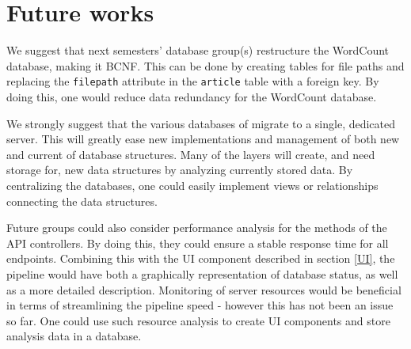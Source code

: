 \section{Future works}
We suggest that next semesters' database group(s) restructure the WordCount database, making it BCNF. 
This can be done by creating tables for file paths and replacing the \texttt{filepath} attribute in the \texttt{article} table with a foreign key.
By doing this, one would reduce data redundancy for the WordCount database. 

We strongly suggest that the various databases of \knox{} migrate to a single, dedicated server.
This will greatly ease new implementations and management of both new and current of database structures.
Many of the layers will create, and need storage for, new data structures by analyzing currently stored data.
By centralizing the \knox{} databases, one could easily implement views or relationships connecting the data structures.

Future groups could also consider performance analysis for the methods of the API controllers. 
By doing this, they could ensure a stable response time for all endpoints.
Combining this with the UI component described in section \ref{UI}, the pipeline would have both a graphically representation of database status, as well as a more detailed description.
Monitoring of server resources would be beneficial in terms of streamlining the pipeline speed - however this has not been an issue so far.
One could use such resource analysis to create UI components and store analysis data in a database.

